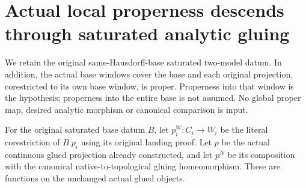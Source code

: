 \section{Actual local properness descends through saturated analytic gluing}

We retain the original same-Hausdorff-base saturated two-model datum. In
addition, the actual base windows cover the base and each original projection,
corestricted to its own base window, is proper. Properness into that window
is the hypothesis; properness into the entire base is not assumed. No global
proper map, desired analytic morphism or canonical comparison is input.

\begin{definition}
\label{hir:disjoint-proper-actual-window-projection}
\leanok
For the original saturated base datum $B$, let $p_i^W:C_i\to W_i$ be the
literal corestriction of $B.p_i$ using its original landing proof. Let $p$
be the actual continuous glued projection already constructed, and let $p^N$
be its composition with the canonical native-to-topological gluing
homeomorphism. These are functions on the unchanged actual glued objects.
\end{definition}

